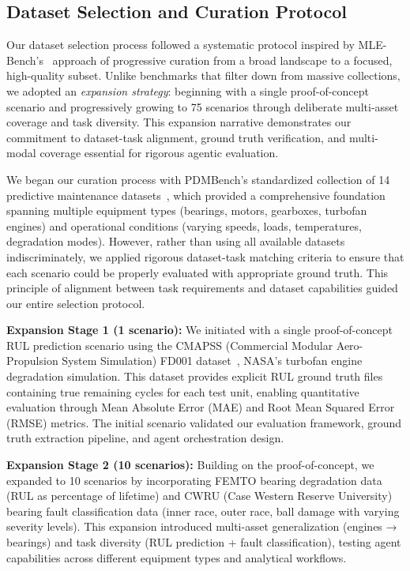 \documentclass[sigconf]{acmart}
\begin{document}
\subsection{Dataset Selection and Curation Protocol}
\label{subsec:datasets}

Our dataset selection process followed a systematic protocol inspired by MLE-Bench's~\cite{patil2024mlebench} approach of progressive curation from a broad landscape to a focused, high-quality subset. Unlike benchmarks that filter down from massive collections, we adopted an \textit{expansion strategy}: beginning with a single proof-of-concept scenario and progressively growing to 75 scenarios through deliberate multi-asset coverage and task diversity. This expansion narrative demonstrates our commitment to dataset-task alignment, ground truth verification, and multi-modal coverage essential for rigorous agentic evaluation.

We began our curation process with PDMBench's standardized collection of 14 predictive maintenance datasets~\cite{pdmBench2023}, which provided a comprehensive foundation spanning multiple equipment types (bearings, motors, gearboxes, turbofan engines) and operational conditions (varying speeds, loads, temperatures, degradation modes). However, rather than using all available datasets indiscriminately, we applied rigorous dataset-task matching criteria to ensure that each scenario could be properly evaluated with appropriate ground truth. This principle of alignment between task requirements and dataset capabilities guided our entire selection protocol.

\textbf{Expansion Stage 1 (1 scenario):} We initiated with a single proof-of-concept RUL prediction scenario using the CMAPSS (Commercial Modular Aero-Propulsion System Simulation) FD001 dataset~\cite{saxena2008phm}, NASA's turbofan engine degradation simulation. This dataset provides explicit RUL ground truth files containing true remaining cycles for each test unit, enabling quantitative evaluation through Mean Absolute Error (MAE) and Root Mean Squared Error (RMSE) metrics. The initial scenario validated our evaluation framework, ground truth extraction pipeline, and agent orchestration design.

\textbf{Expansion Stage 2 (10 scenarios):} Building on the proof-of-concept, we expanded to 10 scenarios by incorporating FEMTO bearing degradation data (RUL as percentage of lifetime) and CWRU (Case Western Reserve University) bearing fault classification data (inner race, outer race, ball damage with varying severity levels). This expansion introduced multi-asset generalization (engines → bearings) and task diversity (RUL prediction + fault classification), testing agent capabilities across different equipment types and analytical workflows.
\end{document}
